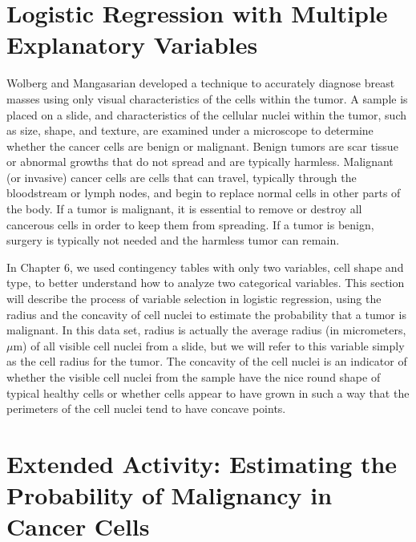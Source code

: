 \documentclass[
]{report}
\begin{document}
\section{\texorpdfstring{\textbf{Logistic Regression with Multiple Explanatory Variables}}{Logistic Regression with Multiple Explanatory Variables}}\label{logistic-regression-with-multiple-explanatory-variables}

Wolberg and Mangasarian developed a technique to accurately diagnose breast masses using only visual characteristics of the cells within the tumor. A sample is placed on a slide, and characteristics of the cellular nuclei within the tumor, such as size, shape, and texture, are examined under a microscope to determine whether the cancer cells are benign or malignant. Benign tumors are scar tissue or abnormal growths that do not spread and are typically harmless. Malignant (or invasive) cancer cells are cells that can travel, typically through the bloodstream or lymph nodes, and begin to replace normal cells in other parts of the body. If a tumor is malignant, it is essential to remove or destroy all cancerous cells in order to keep them from spreading. If a tumor is benign, surgery is typically not needed and the harmless tumor can remain.

In Chapter 6, we used contingency tables with only two variables, cell shape and type, to better understand how to analyze two categorical variables. This section will describe the process of variable selection in logistic regression, using the radius and the concavity of cell nuclei to estimate the probability that a tumor is malignant. In this data set, radius is actually the average radius (in micrometers, \(\mu\)m) of all visible cell nuclei from a slide, but we will refer to this variable simply as the cell radius for the tumor. The concavity of the cell nuclei is an indicator of whether the visible cell nuclei from the sample have the nice round shape of typical healthy cells or whether cells appear to have grown in such a way that the perimeters of the cell nuclei tend to have concave points.

\section*{Extended Activity: Estimating the Probability of Malignancy in Cancer Cells}\label{extended-activity-estimating-the-probability-of-malignancy-in-cancer-cells}
\end{document}
